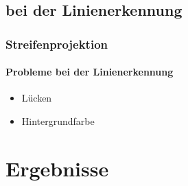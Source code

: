 \documentclass[xcolor=dvipsnames]{beamer}
\begin{document}
\subsection{bei der Linienerkennung}
\begin{frame}
	\frametitle{Streifenprojektion}
	\framesubtitle{Probleme bei der Linienerkennung}

	\begin{itemize}
		\item Lücken
		\item Hintergrundfarbe
	\end{itemize}

\end{frame}

\section{Ergebnisse}
\end{document}
